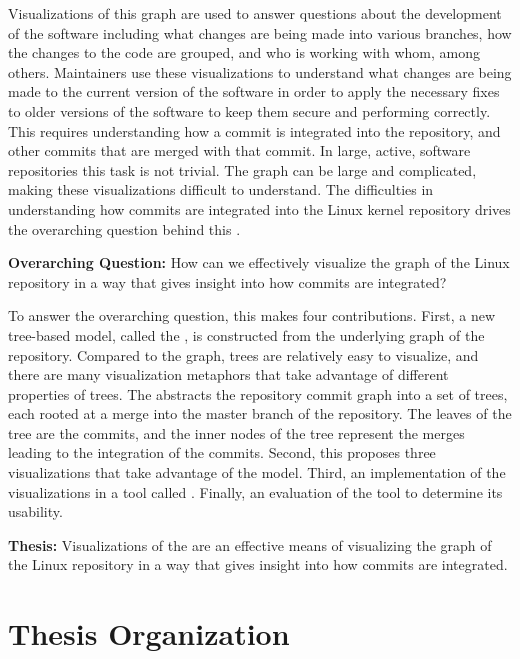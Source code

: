 Visualizations of this graph are used to answer questions about the
development of the software including what changes are being made into
various branches, how the changes to the code are grouped, and who is
working with whom, among others. Maintainers use these visualizations to
understand what changes are being made to the current version of the
software in order to apply the necessary fixes to older versions of the
software to keep them secure and performing correctly. This requires
understanding how a commit is integrated into the repository, and other
commits that are merged with that commit. In large, active, software
repositories this task is not trivial.
The graph can be large and
complicated, making these visualizations difficult to understand.
The difficulties in understanding how commits are integrated into the
Linux kernel repository drives the overarching question behind this
\paper{}.

\begin{textbox}
  \textbf{Overarching Question:} How can we effectively visualize the
  graph of the Linux repository in a way that gives insight into how
  commits are integrated?
\end{textbox}

To answer the overarching question, this \paper{} makes four
contributions.
First, a new tree-based model, called the \mt{},
is constructed from the underlying graph of the repository.
Compared to the graph, trees are relatively easy to visualize, and there are many visualization metaphors that take advantage of different properties of trees.
The \mt{} abstracts the repository commit graph into a set of trees, each rooted at a merge into the master branch of the repository.
The leaves of the tree are the commits, and the inner nodes of the tree represent the merges leading to the integration of the commits.
Second, this \paper{} proposes three visualizations that take advantage of the \mt{} model.
Third, an implementation of the visualizations in a tool called \tool{}.
Finally, an evaluation of the tool to determine its usability.

\begin{textbox}
  \textbf{Thesis:} Visualizations of the \mt{} are an effective means of
  visualizing the graph of the Linux repository in a way that gives
  insight into how commits are integrated.
\end{textbox}

\section{Thesis Organization}\label{sec:thesis_organization}

